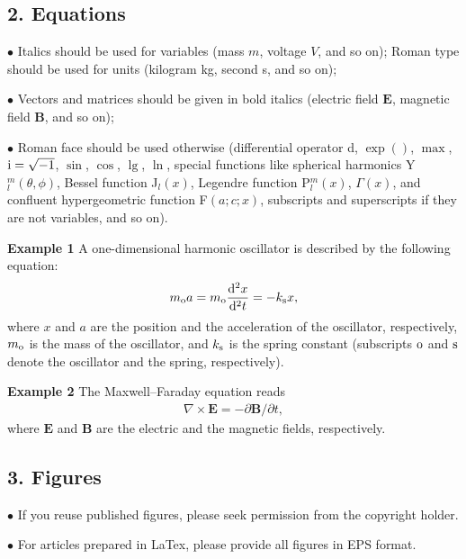 \documentclass{cpbtex}
\begin{document}
\begin{CJK*}{GBK}{song}
\subsection*{2. Equations}

\textcolor[rgb]{0.98,0.00,0.00}{$\bullet$ Italics should be used for variables (mass $m$, voltage $V$, and so on); Roman type should be used for units (kilogram kg, second s, and so on)};

\textcolor[rgb]{0.98,0.00,0.00}{$\bullet$ Vectors and matrices should be given in bold italics (electric field ${\bm E}$, magnetic field ${\bm B}$, and so on)};

\textcolor[rgb]{0.98,0.00,0.00}{$\bullet$ Roman face should be used otherwise (differential operator d, $\exp()$, $\max{}$, ${\rm i}= \sqrt{-1}$, $\sin$, $\cos$, $\lg$, $\ln$, special functions like spherical harmonics Y$^{m}_{l}(\theta,\phi)$, Bessel function J$_{l}(x)$, Legendre function P$^{m}_{l}(x)$, $\Gamma(x)$, and confluent hypergeometric function F$(a;c; x)$, subscripts and superscripts if they are not variables, and so on)}.

\textbf{Example 1} A one-dimensional harmonic oscillator is described by the following equation:
\begin{equation}
m_{\rm o}a=m_{\rm o}\frac{{\rm d}^2 x}{{\rm d}^2 t}=-k_{\rm s}x,
\end{equation}
where $x$ and $a$ are the position and the acceleration of the oscillator, respectively, $m_{\rm o}$
is the mass of the oscillator, and $k_{\rm s}$ is the spring constant (subscripts ${\rm o}$ and ${\rm s}$ denote the oscillator and the spring, respectively).

\textbf{Example 2}
The Maxwell--Faraday equation reads
\begin{eqnarray}%
\nabla\times {\bm E}=-\partial {\bm B}/\partial t,
\end{eqnarray}
where ${\bm E}$ and ${\bm B}$ are the electric and the magnetic fields, respectively.

\subsection*{3. Figures}

\textcolor[rgb]{0.98,0.00,0.00}{$\bullet$ If you reuse published figures, please seek permission from the copyright holder.}

\textcolor[rgb]{0.98,0.00,0.00}{$\bullet$ For articles prepared in LaTex, please provide all figures in EPS format.}


\end{CJK*}
\end{document}
